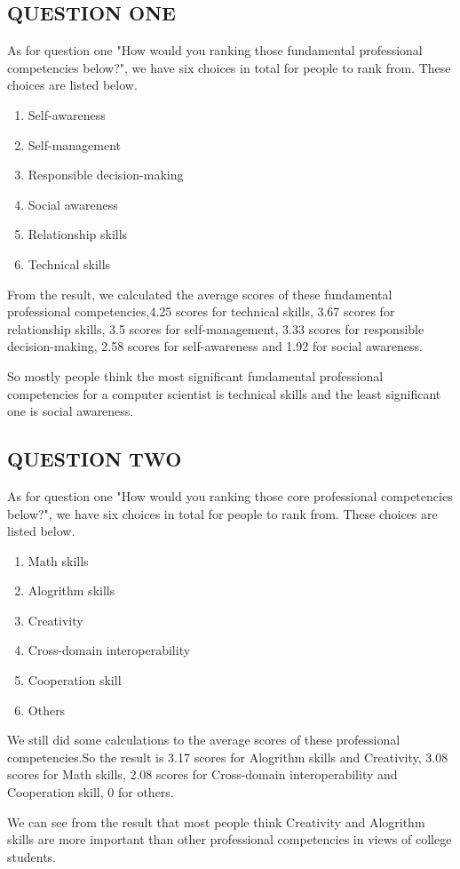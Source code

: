 \documentclass[conference]{IEEEtran}
\begin{document}
\subsection{QUESTION ONE}
As for question one "How would you ranking those fundamental professional competencies below?", we have six choices in total for people to rank from. These choices are listed below.
\begin{enumerate}
    \item Self-awareness
    \item Self-management
    \item Responsible decision-making
    \item Social awareness
    \item Relationship skills
    \item Technical skills
\end{enumerate}
\par From the result, we calculated the average scores of these fundamental professional competencies,4.25 scores for technical skills, 3.67 scores for relationship skills, 3.5 scores for self-management, 3.33 scores for responsible decision-making, 2.58 scores for self-awareness and 1.92 for social awareness.
\par So mostly people think the most significant fundamental professional competencies for a computer scientist is technical skills and the least significant one is social awareness.
\subsection{QUESTION TWO}
\par As for question one "How would you ranking those core professional competencies below?", we have six choices in total for people to rank from. These choices are listed below.
\begin{enumerate}
    \item Math skills
    \item Alogrithm skills
    \item Creativity
    \item Cross-domain interoperability
    \item Cooperation skill
    \item Others
\end{enumerate}
\par We still did some calculations to the average scores of these professional competencies.So the result is 3.17 scores for Alogrithm skills and Creativity, 3.08 scores for Math skills, 2.08 scores for Cross-domain interoperability and Cooperation skill, 0 for others.
\par We can see from the result that most people think Creativity and Alogrithm skills are more important than other professional competencies in views of college students.
\end{document}
